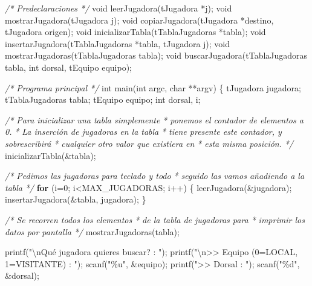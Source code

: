 \documentclass[
]{book}
\newenvironment{Shaded}{\begin{snugshade}}{\end{snugshade}}
\newcommand{\CommentTok}[1]{\textcolor[rgb]{0.56,0.35,0.01}{\textit{#1}}}
\newcommand{\ControlFlowTok}[1]{\textcolor[rgb]{0.13,0.29,0.53}{\textbf{#1}}}
\newcommand{\DataTypeTok}[1]{\textcolor[rgb]{0.13,0.29,0.53}{#1}}
\newcommand{\DecValTok}[1]{\textcolor[rgb]{0.00,0.00,0.81}{#1}}
\newcommand{\NormalTok}[1]{#1}
\newcommand{\SpecialCharTok}[1]{\textcolor[rgb]{0.00,0.00,0.00}{#1}}
\newcommand{\StringTok}[1]{\textcolor[rgb]{0.31,0.60,0.02}{#1}}
\begin{document}
\begin{Shaded}
\begin{Highlighting}[]
\CommentTok{/* Predeclaraciones */}
\DataTypeTok{void}\NormalTok{ leerJugadora(tJugadora *j);}
\DataTypeTok{void}\NormalTok{ mostrarJugadora(tJugadora j);}
\DataTypeTok{void}\NormalTok{ copiarJugadora(tJugadora *destino, tJugadora origen);}
\DataTypeTok{void}\NormalTok{ inicializarTabla(tTablaJugadoras *tabla);}
\DataTypeTok{void}\NormalTok{ insertarJugadora(tTablaJugadoras *tabla, tJugadora j);}
\DataTypeTok{void}\NormalTok{ mostrarJugadoras(tTablaJugadoras tabla);}
\DataTypeTok{void}\NormalTok{ buscarJugadora(tTablaJugadoras tabla, }\DataTypeTok{int}\NormalTok{ dorsal, tEquipo equipo);}

\CommentTok{/* Programa principal */}
\DataTypeTok{int}\NormalTok{ main(}\DataTypeTok{int}\NormalTok{ argc, }\DataTypeTok{char}\NormalTok{ **argv) \{}
\NormalTok{    tJugadora jugadora;}
\NormalTok{    tTablaJugadoras tabla;}
\NormalTok{    tEquipo equipo;}
    \DataTypeTok{int}\NormalTok{ dorsal, i;}
    
    \CommentTok{/* Para inicializar una tabla simplemente}
\CommentTok{     * ponemos el contador de elementos a 0.}
\CommentTok{     * La inserción de jugadoras en la tabla}
\CommentTok{     * tiene presente este contador, y sobrescribirá}
\CommentTok{     * cualquier otro valor que existiera en}
\CommentTok{     * esta misma posición.}
\CommentTok{     */}
\NormalTok{    inicializarTabla(\&tabla);}
    
    \CommentTok{/* Pedimos las jugadoras para teclado y todo}
\CommentTok{     * seguido las vamos añadiendo a la tabla}
\CommentTok{     */}
    \ControlFlowTok{for}\NormalTok{ (i=}\DecValTok{0}\NormalTok{; i\textless{}MAX\_JUGADORAS; i++) \{}
\NormalTok{        leerJugadora(\&jugadora);}
\NormalTok{        insertarJugadora(\&tabla, jugadora);}
\NormalTok{    \}}
    
    \CommentTok{/* Se recorren todos los elementos}
\CommentTok{     * de la tabla de jugadoras para}
\CommentTok{     * imprimir los datos por pantalla}
\CommentTok{     */}
\NormalTok{    mostrarJugadoras(tabla);}
    
\NormalTok{    printf(}\StringTok{"}\SpecialCharTok{\textbackslash{}n}\StringTok{Qué jugadora quieres buscar? : "}\NormalTok{);}
\NormalTok{    printf(}\StringTok{"}\SpecialCharTok{\textbackslash{}n}\StringTok{\textgreater{}\textgreater{} Equipo (0=LOCAL, 1=VISITANTE) : "}\NormalTok{);}
\NormalTok{    scanf(}\StringTok{"\%u"}\NormalTok{, \&equipo);}
\NormalTok{    printf(}\StringTok{"\textgreater{}\textgreater{} Dorsal : "}\NormalTok{);}
\NormalTok{    scanf(}\StringTok{"\%d"}\NormalTok{, \&dorsal);}
    

\end{Highlighting}
\end{Shaded}
\end{document}
